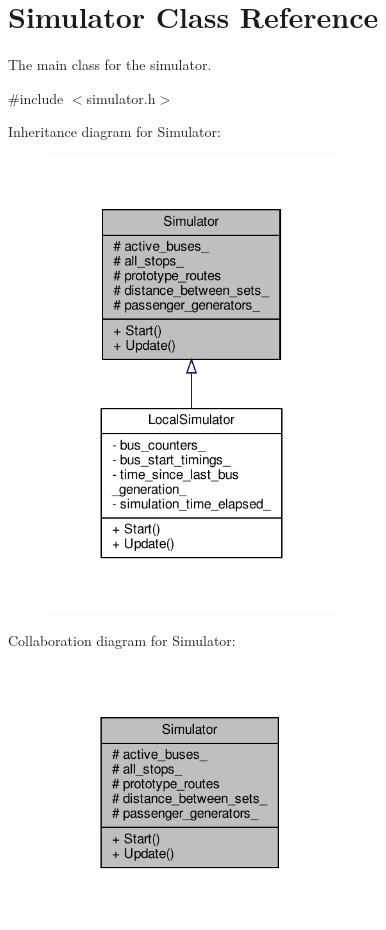 \hypertarget{classSimulator}{}\section{Simulator Class Reference}
\label{classSimulator}


The main class for the simulator.  




{\ttfamily \#include $<$simulator.\+h$>$}



Inheritance diagram for Simulator\+:\nopagebreak
\begin{figure}[H]
\begin{center}
\leavevmode
\includegraphics[width=215pt]{classSimulator__inherit__graph}
\end{center}
\end{figure}


Collaboration diagram for Simulator\+:\nopagebreak
\begin{figure}[H]
\begin{center}
\leavevmode
\includegraphics[width=213pt]{classSimulator__coll__graph}
\end{center}
\end{figure}
